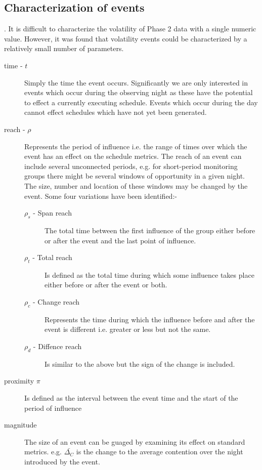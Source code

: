 \subsection{Characterization of events}.
\label{sect:volchar} 
It is difficult to characterize the volatility of Phase 2 data with a single numeric value. However, it was found that volatility events could be characterized by a relatively small number of parameters.
\begin{description} 
\item [time - $t$] Simply the time the event occurs. Significantly we are only interested in events which occur during the observing night as these have the potential to effect a currently executing schedule. Events which occur during the day cannot effect schedules which have not yet been generated.
\item [reach - $\rho$] Represents the period of influence i.e. the range of times over which the event has an effect on the schedule metrics. The reach of an event can include several unconnected periods, e.g.  for short-period monitoring groups there might be several windows of opportunity in a given night. The size, number and location of these windows may be changed by the event. Some four variations have been identified:-
\begin{description}

\item [$\rho_s$ - Span reach] The total time between the first influence of the group either before or after the event and the last point of influence.
\item [$\rho_t$ - Total reach] Is defined as the total time during which some influence takes place either before or after the event or both.
\item [$\rho_c$ - Change reach] Represents the time during which the influence before and after the event is different i.e. greater or less but not the same. 
\item [$\rho_d$ - Diffence reach] Is similar to the above but the sign of the change is included.
\end{description}
\item [proximity $\pi$] Is defined as the interval between the event time and the start of the period of influence
\item [magnitude] The size of an event can be guaged by examining its effect on standard metrics. e.g. $\bar{\Delta_C}$ is the change to the average contention over the night introduced by the event.
\end{description}


